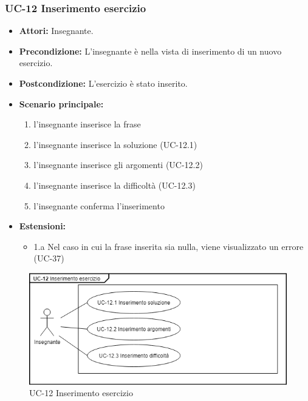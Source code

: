 \subsubsection{UC-12 Inserimento esercizio}
	\begin{itemize}
		\item \textbf{Attori: }Insegnante.
		\item \textbf{Precondizione: }L'insegnante è nella vista di inserimento di un nuovo esercizio.
		\item \textbf{Postcondizione: }L'esercizio è stato inserito.
		\item \textbf{Scenario principale: }
			\begin{enumerate} 
				\item l'insegnante inserisce la frase
				\item l'insegnante inserisce la soluzione (UC-12.1)
				\item l'insegnante inserisce gli argomenti (UC-12.2)
				\item l'insegnante inserisce la difficoltà (UC-12.3)
				\item l'insegnante conferma l'inserimento
			\end{enumerate}
		\item \textbf{Estensioni:} 
			\begin{itemize}
				\item 1.a Nel caso in cui la frase inserita sia nulla, viene visualizzato un errore (UC-37)
			\end{itemize}
	\end{itemize}
	\begin{figure}[h]
		\centering
		\includegraphics[scale=0.7]{images/UC-12.png}
		\caption{UC-12 Inserimento esercizio}
	\end{figure}

